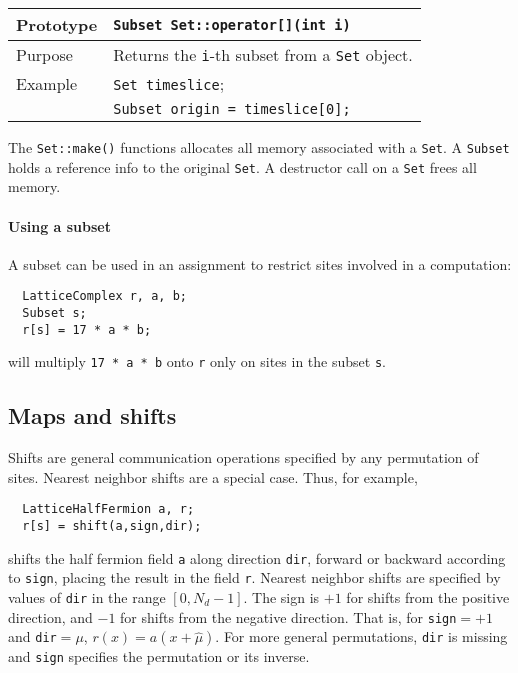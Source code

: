 \documentclass[12pt,letterpaper]{article}
\begin{document}
\begin{flushleft}
  \begin{tabular}{|l|l|}
  \hline
  Prototype    & \verb|Subset Set::operator[](int i)| \\
    \hline
Purpose        & Returns the \verb|i|-th subset from a \verb|Set| object.\\
    \hline
Example  & \verb|Set timeslice|; \\
         & \verb|Subset origin = timeslice[0];| \\
   \hline
  \end{tabular}
\end{flushleft}

The \verb|Set::make()| functions allocates all memory associated with
a \verb|Set|. A \verb|Subset| holds a reference info to the original
\verb|Set|. A destructor call on a \verb|Set| frees all memory.

\paragraph{Using a subset}

A subset can be used in an assignment to restrict sites involved in
a computation:
%
\begin{verbatim}
  LatticeComplex r, a, b;
  Subset s;
  r[s] = 17 * a * b;
\end{verbatim}
%
will multiply {\tt 17 * a * b} onto {\tt r} only on sites in the 
subset {\tt s}.

\subsection{Maps and shifts}
\label{sec:shifts}

Shifts are general communication operations specified by any
permutation of sites.  Nearest neighbor shifts are a special case.
Thus, for example,
%
\begin{verbatim}
  LatticeHalfFermion a, r;
  r[s] = shift(a,sign,dir);
\end{verbatim}
%
shifts the half fermion field {\tt a} along direction {\tt dir},
forward or backward according to {\tt sign}, placing the result in the
field {\tt r}.  Nearest neighbor shifts are specified by values of
{\tt dir} in the range $[0,N_d-1]$.  The sign is $+1$ for shifts from
the positive direction, and $-1$ for shifts from the negative
direction.  That is, for {\tt sign}$= +1$ and {\tt dir}$= \mu$, $r(x)
= a(x+\hat \mu)$. For more general permutations, {\tt dir} is missing
and {\tt sign} specifies the permutation or its inverse.
\end{document}
